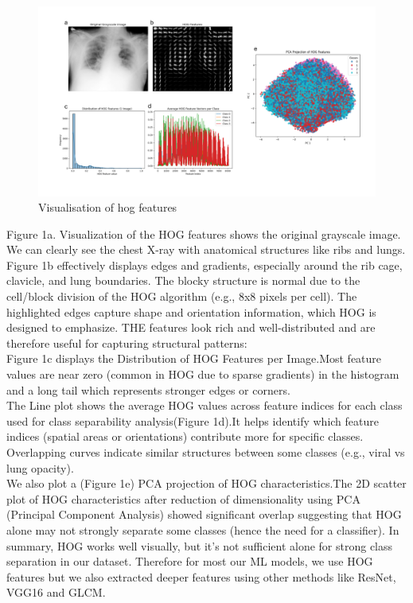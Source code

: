 \documentclass{article}
\begin{document}
\begin{figure}[ht] %
    \centering
    \includegraphics[width=1.0\linewidth]{hogfeatures_all.png}
    \caption{Visualisation of hog features}
    \label{Visualisation of hog features}
\end{figure}
Figure 1a. Visualization of the HOG features shows the original grayscale image. We can clearly see the chest X-ray with anatomical structures like ribs and lungs.\\
Figure 1b effectively displays edges and gradients, especially around the rib cage, clavicle, and lung boundaries. The blocky structure is normal due to the cell/block division of the HOG algorithm (e.g., 8x8 pixels per cell). The highlighted edges capture shape and orientation information, which HOG is designed to emphasize. THE features look rich and well-distributed and are therefore useful for capturing structural patterns:\\
Figure 1c displays the Distribution of HOG Features per Image.Most feature values are near zero (common in HOG due to sparse gradients) in the histogram and a long tail which represents stronger edges or corners.\\
The Line plot shows the average HOG values across feature indices for each class used for class separability analysis(Figure 1d).It helps identify which feature indices (spatial areas or orientations) contribute more for specific classes. Overlapping curves indicate similar structures between some classes (e.g., viral vs lung opacity).\\
We also plot a (Figure 1e) PCA projection of HOG characteristics.The 2D scatter plot of HOG characteristics after reduction of dimensionality using PCA (Principal Component Analysis) showed significant overlap suggesting that HOG alone may not strongly separate some classes (hence the need for a classifier).
In summary, HOG works well visually, but it’s not sufficient alone for strong class separation in our dataset. Therefore for most our ML models, we use HOG features but we also extracted deeper features using other methods like ResNet, VGG16 and GLCM.
\\
\end{document}
